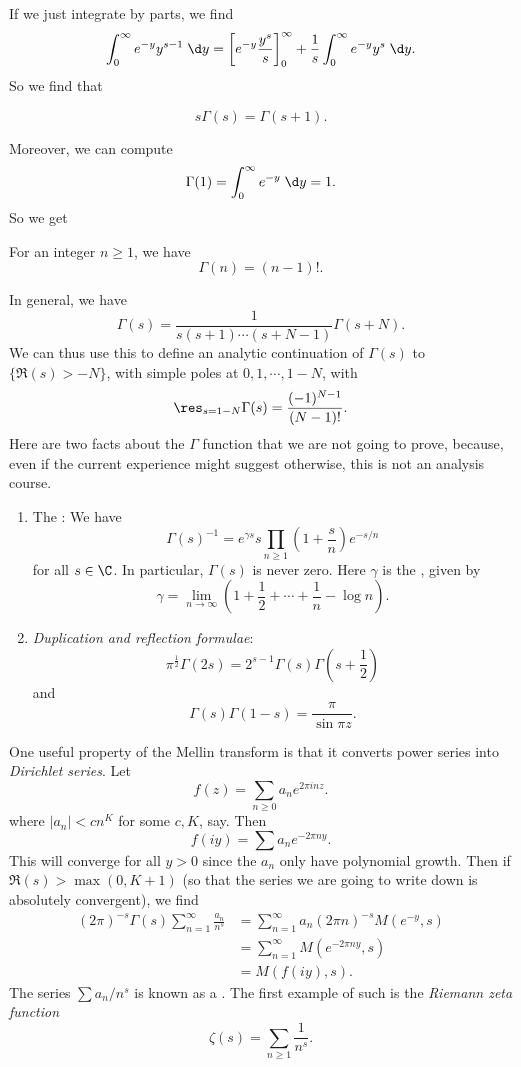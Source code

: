 \documentclass[a4paper]{article}
\begin{document}
If we just integrate by parts, we find
\[
  \int_0^\infty e^{-y} y^{s - 1}\;\d y = \left[e^{-y} \frac{y^s}{s} \right]_0^\infty + \frac{1}{s}\int_0^\infty e^{-y} y^s \;\d y.
\]
So we find that
\begin{prop}
  \[
    s \Gamma(s) = \Gamma(s + 1).
  \]
\end{prop}
Moreover, we can compute
\[
  \Gamma(1) = \int_0^\infty e^{-y}\;\d y = 1.
\]
So we get
\begin{prop}
  For an integer $n \geq 1$, we have
  \[
    \Gamma(n) = (n - 1)!.
  \]
\end{prop}
In general, we have
\[
  \Gamma(s) = \frac{1}{s (s + 1) \cdots (s + N - 1)} \Gamma(s + N).
\]
We can thus use this to define an analytic continuation of $\Gamma(s)$ to $\{\Re(s) > -N\}$, with simple poles at $0, 1, \cdots, 1 - N$, with
\[
  \res_{s = 1 - N} \Gamma(s) = \frac{(-1)^{N - 1}}{(N - 1)!}.
\]
Here are two facts about the $\Gamma$ function that we are not going to prove, because, even if the current experience might suggest otherwise, this is not an analysis course.
\begin{prop}\leavevmode
  \begin{enumerate}
    \item The : We have
      \[
        \Gamma(s)^{-1} = e^{\gamma s} s \prod_{n \geq 1} \left(1 + \frac{s}{n}\right) e^{-s/n}
      \]
      for all $s \in \C$. In particular, $\Gamma(s)$ is never zero. Here $\gamma$ is the , given by
      \[
        \gamma = \lim_{n \to \infty}\left(1 + \frac{1}{2} + \cdots + \frac{1}{n} - \log n\right).
      \]
    \item \emph{Duplication and reflection formulae}:
      \[
        \pi^{\frac{1}{2}} \Gamma(2s) = 2^{s - 1} \Gamma(s) \Gamma\left(s + \frac{1}{2}\right)
      \]
      and
      \[
        \Gamma(s) \Gamma(1 - s) = \frac{\pi}{\sin \pi z}.
      \]
  \end{enumerate}
\end{prop}

One useful property of the Mellin transform is that it converts power series into \emph{Dirichlet series}. Let
\[
  f(z) = \sum_{n \geq 0} a_n e^{2\pi i n z}.
\]
where $|a_n| < c n^K$ for some $c, K$, say. Then
\[
  f(iy) = \sum a_n e^{-2\pi n y}.
\]
This will converge for all $y > 0$ since the $a_n$ only have polynomial growth. Then if $\Re(s) > \max(0, K + 1)$ (so that the series we are going to write down is absolutely convergent), we find
\begin{align*}
  (2\pi)^{-s} \Gamma(s)\sum_{n = 1}^\infty \frac{a_n}{n^s} &= \sum_{n = 1}^\infty a_n (2\pi n)^{-s} M(e^{-y}, s)\\
  &= \sum_{n = 1}^\infty M(e^{-2 \pi n y}, s) \\
  &= M(f(iy), s).
\end{align*}
The series $\sum a_n/n^s$ is known as a . The first example of such is the \emph{Riemann zeta function}
\[
  \zeta(s) = \sum_{n \geq 1} \frac{1}{n^s}.
\]
\end{document}
